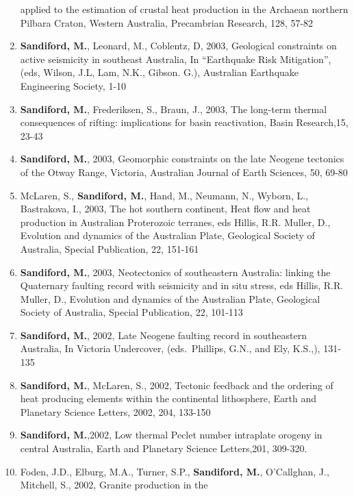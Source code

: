 \documentclass[
]{article}
\begin{document}
\begin{enumerate}
  applied to the estimation of crustal heat production in the Archaean
  northern Pilbara Craton, Western Australia, Precambrian Research, 128,
  57-82
\item
  \textbf{Sandiford, M.}, Leonard, M., Coblentz, D, 2003, Geological
  constraints on active seismicity in southeast Australia, In
  ``Earthquake Risk Mitigation'', (eds, Wilson, J.L, Lam, N.K., Gibson.
  G.), Australian Earthquake Engineering Society, 1-10
\item
  \textbf{Sandiford, M.}, Frederiksen, S., Braun, J., 2003, The
  long-term thermal consequences of rifting: implications for basin
  reactivation, Basin Research,15, 23-43 
\item
  \textbf{Sandiford, M.}, 2003, Geomorphic constraints on the late
  Neogene tectonics of the Otway Range, Victoria, Australian Journal of
  Earth Sciences, 50, 69-80 
\item
  McLaren, S., \textbf{Sandiford, M.}, Hand, M., Neumann, N., Wyborn,
  L., Bastrakova, I., 2003, The hot southern continent, Heat flow and
  heat production in Australian Proterozoic terranes, eds Hillis, R.R.
  Muller, D., Evolution and dynamics of the Australian Plate, Geological
  Society of Australia, Special Publication, 22, 151-161
\item
  \textbf{Sandiford, M.}, 2003, Neotectonics of southeastern Australia:
  linking the Quaternary faulting record with seismicity and in situ
  stress, eds Hillis, R.R. Muller, D., Evolution and dynamics of the
  Australian Plate, Geological Society of Australia, Special
  Publication, 22, 101-113 
\item
  \textbf{Sandiford, M.}, 2002, Late Neogene faulting record in
  southeastern Australia, In Victoria Undercover, (eds.~Phillips, G.N.,
  and Ely, K.S.,), 131-135
\item
  \textbf{Sandiford, M.}, McLaren, S., 2002, Tectonic feedback and the
  ordering of heat producing elements within the continental
  lithosphere, Earth and Planetary Science Letters, 2002, 204, 133-150
\item
  \textbf{Sandiford, M.},2002, Low thermal Peclet number intraplate
  orogeny in central Australia, Earth and Planetary Science Letters,201,
  309-320. 
\item
  Foden, J.D., Elburg, M.A., Turner, S.P., \textbf{Sandiford, M.},
  O'Callghan, J., Mitchell, S., 2002, Granite production in the

\end{enumerate}
\end{document}
